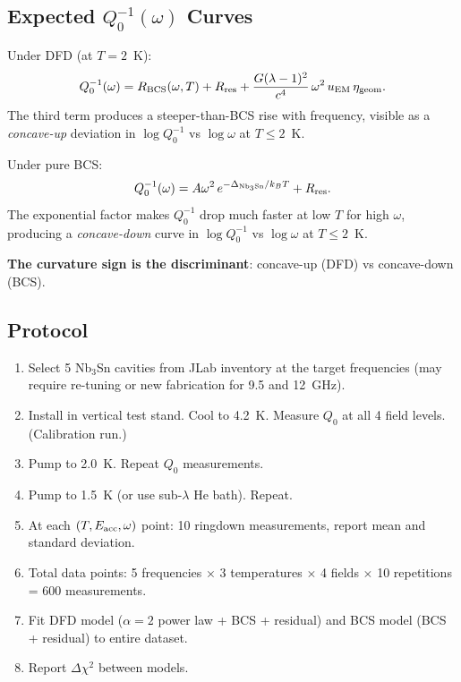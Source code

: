 \documentclass[11pt]{article}
\begin{document}
\subsection{Expected $Q_0^{-1}(\omega)$ Curves}

Under DFD (at $T = 2$~K):
\begin{equation}
Q_0^{-1}(\omega) = R_{\rm BCS}(\omega, T) + R_{\rm res} +
\frac{G(\lambda-1)^2}{c^4}\,\omega^2\,u_{\rm EM}\,\eta_{\rm geom}.
\end{equation}
The third term produces a steeper-than-BCS rise with frequency, visible
as a \emph{concave-up} deviation in $\log Q_0^{-1}$ vs $\log \omega$
at $T \leq 2$~K.

Under pure BCS:
\begin{equation}
Q_0^{-1}(\omega) = A\omega^2\,e^{-\Delta_{\rm Nb_3Sn}/k_B T} + R_{\rm res}.
\end{equation}
The exponential factor makes $Q_0^{-1}$ drop much faster at low $T$
for high $\omega$, producing a \emph{concave-down} curve in
$\log Q_0^{-1}$ vs $\log \omega$ at $T \leq 2$~K.

\textbf{The curvature sign is the discriminant}: concave-up (DFD) vs
concave-down (BCS).

\subsection{Protocol}

\begin{enumerate}[nosep]
\item Select 5 Nb$_3$Sn cavities from JLab inventory at the target
  frequencies (may require re-tuning or new fabrication for 9.5 and
  12~GHz).
\item Install in vertical test stand. Cool to 4.2~K. Measure $Q_0$
  at all 4 field levels. (Calibration run.)
\item Pump to 2.0~K. Repeat $Q_0$ measurements.
\item Pump to 1.5~K (or use sub-$\lambda$ He bath). Repeat.
\item At each $(T, E_{\rm acc}, \omega)$ point: 10 ringdown
  measurements, report mean and standard deviation.
\item Total data points: 5 frequencies $\times$ 3 temperatures
  $\times$ 4 fields $\times$ 10 repetitions = 600 measurements.
\item Fit DFD model ($\alpha = 2$ power law + BCS + residual) and
  BCS model (BCS + residual) to entire dataset.
\item Report $\Delta\chi^2$ between models.
\end{enumerate}
\end{document}
